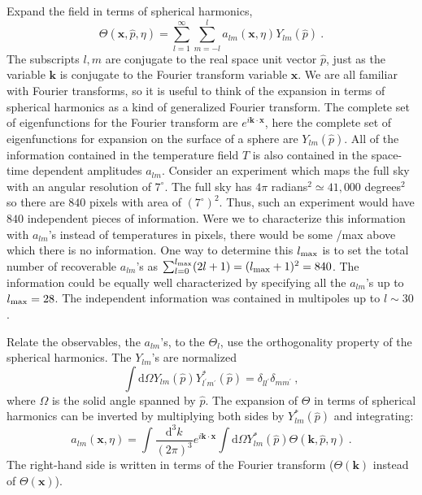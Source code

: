 \documentclass[12pt,a4paper]{article}
\renewcommand{\vec}[1]{\boldsymbol{#1}}
\newcommand{\dif}{\mathrm{d}}
\begin{document}
Expand the field in terms of spherical harmonics,
\begin{equation}
\Theta(\vec{x}, \hat{p}, \eta) = \sum_{l=1}^\infty \sum_{m=-l}^{l} a_{lm}(\vec{x}, \eta) Y_{lm}(\hat{p}) ~.
\end{equation}
The subscripts $l, m$ are conjugate to the real space unit vector $\hat{p}$, just as the variable $\vec{k}$ is conjugate to the Fourier transform variable $\vec{x}$. We are all familiar with Fourier transforms, so it is useful to think of the expansion in terms of spherical harmonics as a kind of generalized Fourier transform. The complete set of eigenfunctions for the Fourier transform are $e^{i\vec{k}\cdot \vec{x}}$, here the complete set of eigenfunctions for expansion on the surface of a sphere are $Y_{lm}(\hat{p})$. All of the information contained in the temperature field $T$ is also contained in the space-time dependent amplitudes $a_{lm}$. Consider an experiment which maps the full sky with an angular resolution of $7^\circ$. The full sky has $4\pi$ radians$^2 \simeq 41,000$ degrees$^2$ so there 
are $840$ pixels with area of $(7^\circ)^2$. Thus, such an experiment would have $840$ independent pieces of information. Were we to characterize this information with $a_{lm}$'s instead of temperatures in pixels, there would be some /max above which there is no information. One way to determine this $l_{\rm max}$ is to set the total number of recoverable $a_{lm}$'s as $\sum_{l=0}^{l_{\rm max}} (2l+1) = (l_{\rm max} +1)^2 = 840$. The information could be equally well characterized by specifying all the $a_{lm}$'s up to $l_{\rm max} = 28$. The independent information was contained in multipoles up to $l \sim 30$. 

Relate the observables, the $a_{lm}$'s, to the $\Theta_l$, use the orthogonality property of the spherical harmonics. The $Y_{lm}$'s are normalized 
\begin{equation}
\int \dif \Omega Y_{lm}(\hat{p}) Y_{l^\prime m^\prime}^\ast(\hat{p}) = \delta_{ll^\prime} \delta_{mm^\prime} ~,
\end{equation}
where $\Omega$ is the solid angle spanned by $\hat{p}$. The expansion of $\Theta$ in terms of spherical harmonics can be inverted by multiplying both sides by $Y_{lm}^\ast(\hat{p})$ and integrating: 
\begin{equation}
a_{lm}(\vec{x}, \eta) = \int \dfrac{\dif^3 k}{(2\pi)^3} e^{i\vec{k}\cdot \vec{x}} \int \dif \Omega Y_{lm}^\ast(\hat{p}) \Theta(\vec{k}, \hat{p}, \eta) ~.
\end{equation}
The right-hand side is written in terms of the Fourier transform ($\Theta(\vec{k})$ instead of $\Theta(\vec{x})$).
\end{document}
